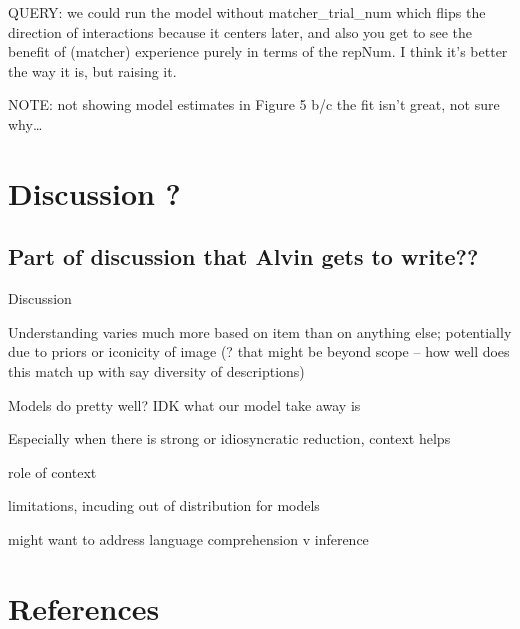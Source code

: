 \documentclass[10pt, letterpaper]{article}
\begin{document}
QUERY: we could run the model without matcher\_trial\_num which flips
the direction of interactions because it centers later, and also you get
to see the benefit of (matcher) experience purely in terms of the
repNum. I think it's better the way it is, but raising it.

NOTE: not showing model estimates in Figure 5 b/c the fit isn't great,
not sure why\ldots{}

\section{Discussion ?}\label{discussion}

\subsection{Part of discussion that Alvin gets to
write??}\label{part-of-discussion-that-alvin-gets-to-write}

Discussion

Understanding varies much more based on item than on anything else;
potentially due to priors or iconicity of image (? that might be beyond
scope -- how well does this match up with say diversity of descriptions)

Models do pretty well? IDK what our model take away is

Especially when there is strong or idiosyncratic reduction, context
helps

role of context

limitations, incuding out of distribution for models

might want to address language comprehension v inference

\section{References}\label{references}

\setlength{\parindent}{-0.1in} 
\setlength{\leftskip}{0.125in}

\noindent


\end{document}
